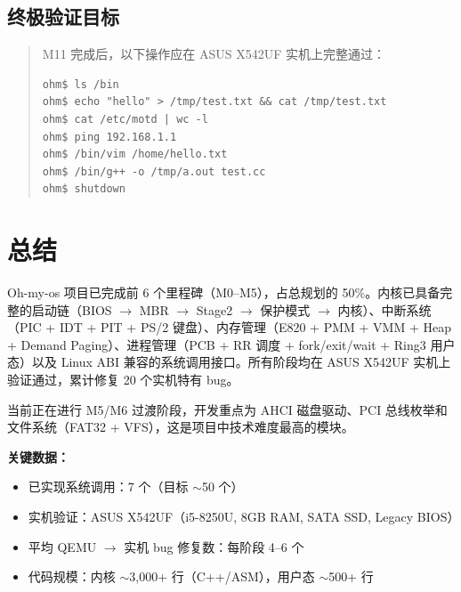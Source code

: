 \documentclass[12pt,a4paper]{article}
\begin{document}
\subsection{终极验证目标}

\begin{quote}
M11 完成后，以下操作应在 ASUS X542UF 实机上完整通过：
\begin{verbatim}
ohm$ ls /bin
ohm$ echo "hello" > /tmp/test.txt && cat /tmp/test.txt
ohm$ cat /etc/motd | wc -l
ohm$ ping 192.168.1.1
ohm$ /bin/vim /home/hello.txt
ohm$ /bin/g++ -o /tmp/a.out test.cc
ohm$ shutdown
\end{verbatim}
\end{quote}

\section{总结}

Oh-my-os 项目已完成前 6 个里程碑（M0--M5），占总规划的 50\%。内核已具备完整的启动链（BIOS $\to$ MBR $\to$ Stage2 $\to$ 保护模式 $\to$ 内核）、中断系统（PIC + IDT + PIT + PS/2 键盘）、内存管理（E820 + PMM + VMM + Heap + Demand Paging）、进程管理（PCB + RR 调度 + fork/exit/wait + Ring3 用户态）以及 Linux ABI 兼容的系统调用接口。所有阶段均在 ASUS X542UF 实机上验证通过，累计修复 20 个实机特有 bug。

当前正在进行 M5/M6 过渡阶段，开发重点为 AHCI 磁盘驱动、PCI 总线枚举和文件系统（FAT32 + VFS），这是项目中技术难度最高的模块。

\textbf{关键数据：}
\begin{itemize}
    \item 已实现系统调用：7 个（目标 $\sim$50 个）
    \item 实机验证：ASUS X542UF（i5-8250U, 8GB RAM, SATA SSD, Legacy BIOS）
    \item 平均 QEMU $\to$ 实机 bug 修复数：每阶段 4--6 个
    \item 代码规模：内核 $\sim$3,000+ 行（C++/ASM），用户态 $\sim$500+ 行
\end{itemize}
\end{document}
